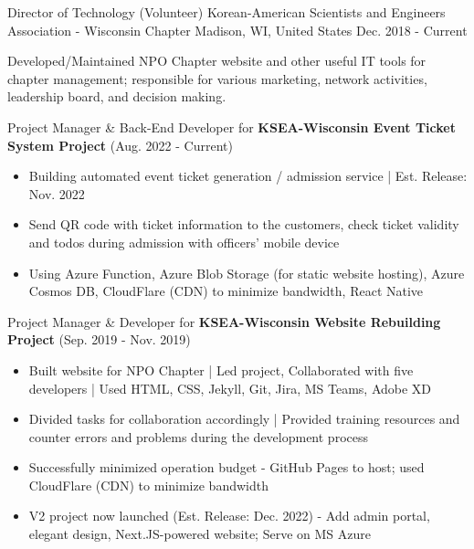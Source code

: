 

\begin{cventries}

  \cventry
  {Director of Technology (Volunteer)} %
  {Korean-American Scientists and Engineers Association - Wisconsin Chapter} %
  {Madison, WI, United States} %
  {Dec. 2018 - Current} %
  {
    \begin{cvitems} %
      \item {Developed/Maintained NPO Chapter website and other useful IT tools for chapter management; responsible for various marketing, network activities, leadership board, and decision making.}
      \item {Project Manager \& Back-End Developer for \textbf{KSEA-Wisconsin Event Ticket System Project} (Aug. 2022 - Current)}
      \begin{itemize}[label={}]
        \setlength{\itemindent}{-24pt}
        \item {Building automated event ticket generation / admission service | Est. Release: Nov. 2022}
        \item {Send QR code with ticket information to the customers, check ticket validity and todos during admission with officers' mobile device}
        \item {Using Azure Function, Azure Blob Storage (for static website hosting), Azure Cosmos DB, CloudFlare (CDN) to minimize bandwidth, React Native}
      \end{itemize}
      \item {Project Manager \& Developer for \textbf{KSEA-Wisconsin Website Rebuilding Project} (Sep. 2019 - Nov. 2019)}
      \begin{itemize}[label={}]
        \setlength{\itemindent}{-24pt}
        \item {Built website for NPO Chapter | Led project, Collaborated with five developers | Used HTML, CSS, Jekyll, Git, Jira, MS Teams, Adobe XD}
        \item {Divided tasks for collaboration accordingly | Provided training resources and counter errors and problems during the development process}
        \item {Successfully minimized operation budget - GitHub Pages to host; used CloudFlare (CDN) to minimize bandwidth}
        \item {V2 project now launched (Est. Release: Dec. 2022) - Add admin portal, elegant design, Next.JS-powered website; Serve on MS Azure}
      \end{itemize}
    \end{cvitems}
  }


\end{cventries}

